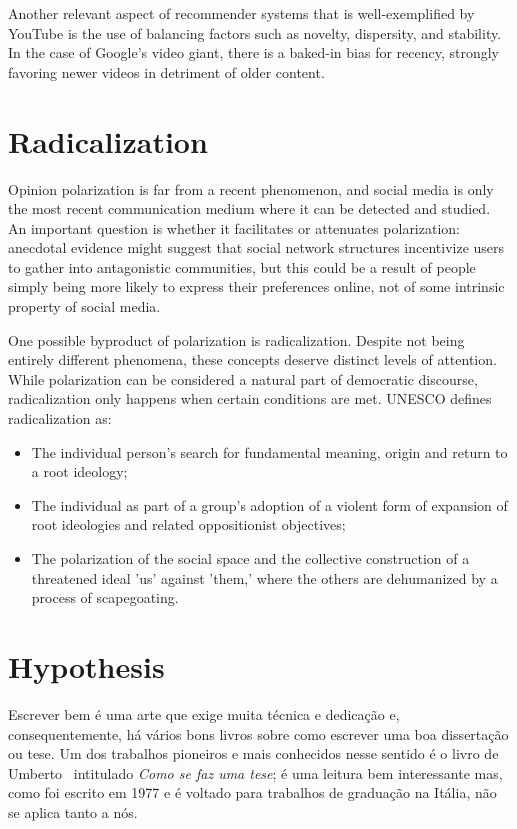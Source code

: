 Another relevant aspect of recommender systems that is well-exemplified by
YouTube is the use of balancing factors such as novelty, dispersity, and
stability. In the case of Google's video giant, there is a baked-in bias for
recency, strongly favoring newer videos in detriment of older content.

\section{Radicalization}
\label{sec:radicalization}

Opinion polarization is far from a recent phenomenon, and social media is only
the most recent communication medium where it can be detected and studied. An
important question is whether it facilitates or attenuates polarization:
anecdotal evidence might suggest that social network structures incentivize
users to gather into antagonistic communities, but this could be a result of
people simply being more likely to express their preferences online, not of some
intrinsic property of social media.

One possible byproduct of polarization is radicalization. Despite not being
entirely different phenomena, these concepts deserve distinct levels of
attention. While polarization can be considered a natural part of democratic
discourse, radicalization only happens when certain conditions are met. UNESCO
defines radicalization as:

\begin{itemize}
  \item The individual person's search for fundamental meaning, origin and
        return to a root ideology;
  \item The individual as part of a group's adoption of a violent form of
        expansion of root ideologies and related oppositionist objectives;
  \item The polarization of the social space and the collective construction of
        a threatened ideal 'us' against 'them,' where the others are dehumanized
        by a process of scapegoating.
\end{itemize}

\section{Hypothesis}
\label{sec:hypothesis}

Escrever bem é uma arte que exige muita técnica e dedicação e,
consequentemente, há vários bons livros sobre como escrever uma boa
dissertação ou tese. Um dos trabalhos pioneiros e mais conhecidos nesse
sentido é o livro de
Umberto~\citet{eco:09} %
intitulado \emph{Como se faz uma tese}; é uma leitura bem interessante mas,
como foi escrito em 1977 e é voltado para trabalhos de graduação na Itália,
não se aplica tanto a nós.

